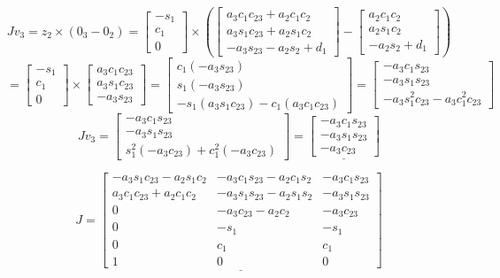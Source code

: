 \documentclass[12pt,norsk,a4paper]{article}
\begin{document}
    \vspace{6mm}
    \[Jv_3 = z_2\times(0_3-0_2) = \left[\begin{array}{c}-s_1 \\ c_1 \\ 0\end{array}\right]\times\left(\left[\begin{array}{c}a_3c_1c_{23}+a_2c_1c_2 \\  a_3s_1c_{23}+a_2s_1c_2 \\ -a_3s_{23}-a_2s_2+d_1\end{array}\right]-\left[\begin{array}{c}a_2c_1c_2 \\ a_2s_1c_2 \\ -a_2s_2+d_1\end{array}\right]\right) \]
    \[= \left[\begin{array}{c}-s_1 \\ c_1 \\ 0\end{array}\right]\times\left[\begin{array}{c}a_3c_1c_{23} \\  a_3s_1c_{23} \\ -a_3s_{23}\end{array}\right] = \left[\begin{array}{c} c_1(-a_3s_{23}) \\ s_1(-a_3s_{23}) \\ -s_1( a_3s_1c_{23})-c_1(a_3c_1c_{23})\end{array}\right] = \left[\begin{array}{c} -a_3c_1s_{23} \\ -a_3s_1s_{23}\\ -a_3s_1^2c_{23}-a_3c_1^2c_{23}\end{array}\right]\]
    \[Jv_3=  \left[\begin{array}{c} -a_3c_1s_{23} \\ -a_3s_1s_{23}\\ s_1^2(-a_3c_{23})+c_1^2(-a_3c_{23})\end{array}\right]=\underline{\left[\begin{array}{c} -a_3c_1s_{23} \\ -a_3s_1s_{23}\\ -a_3c_{23}\end{array}\right]}\]

    \vspace{6mm}
    \[J = \underline{\left[\begin{array}{ccc}
        -a_3s_1c_{23}-a_2s_1c_2 & -a_3c_1s_{23}-a_2c_1s_2 & -a_3c_1s_{23}\\
        a_3c_1c_{23}+a_2c_1c_2 & -a_3s_1s_{23}-a_2s_1s_2 & -a_3s_1s_{23}\\
        0 & -a_3c_{23}-a_2c_2 & -a_3c_{23}\\
        0 & -s_1 & -s_1\\
        0 & c_1 & c_1\\
        1 & 0 & 0
    \end{array}\right]} \]
\end{document}

